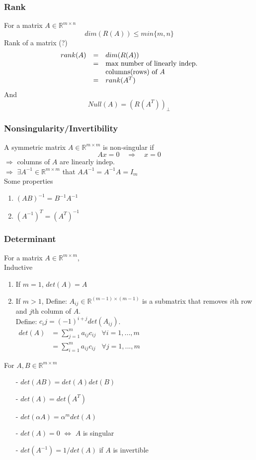 \begin{multicols}{2}
\subsubsection{Rank}
For a matrix $A\in\mathbb{R}^{m\times n}$
\[
    dim(R(A))\leq min\{m,n\}
\]
Rank of a matrix (?)
\[
    \begin{array}{cll}
        rank(A) & = &dim(R(A)) \\
        & = &\text{\rm max number of linearly indep.} \\
        & & \text{\rm columns(rows) of } A \\
        & = &rank(A^T)
    \end{array}
\]
And
\[
    Null(A)=(R(A^T))_\bot
\]

\subsubsection{Nonsingularity/Invertibility}
A symmetric matrix $A\in\mathbb{R}^{m\times m}$ is non-singular if
\[
    Ax=0\quad \Longrightarrow \quad x=0
\]
$\Longrightarrow$ columns of $A$ are linearly indep. \\
$\Longrightarrow$ $\exists A^{-1}\in\mathbb{R}^{m\times m}$ that $AA^{-1}=A^{-1}A=I_m$ \\
Some properties
\begin{enumerate}
    \item $(AB)^{-1}=B^{-1}A^{-1}$
    \item $(A^{-1})^T=(A^T)^{-1}$
\end{enumerate}

\subsubsection{Determinant}
For a matrix $A\in\mathbb{R}^{m\times m}$, \\
Inductive
\begin{enumerate}
    \item If $m=1$, $det(A)=A$
    \item If $m>1$,
    Define: $A_{ij}\in\mathbb{R}^{(m-1)\times(m-1)}$ is a submatrix that removes $i$th row and 
    $j$th column of $A$. \\
    Define: $c_ij=(-1)^{i+j}det(A_{ij})$. \\
    $\begin{array}{lll}
        det(A) &=\sum_{j=1}^m a_{ij}c_{ij}& \forall i=1,...,m \\
        & = \sum_{i=1}^m a_{ij}c_{ij} & \forall j = 1,...,m
    \end{array}$
\end{enumerate}
For $A,B\in\mathbb{R}^{m\times m}$
\begin{itemize}
    \item [-] $det(AB)=det(A)det(B)$
    \item [-] $det(A)=det(A^T)$
    \item [-] $det(\alpha A)=\alpha^m det(A)$
    \item [-] $det(A)=0$ $\Longleftrightarrow$ $A$ is singular
    \item [-] $det(A^{-1})=1/det(A)$ if $A$ is invertible
\end{itemize}


\end{multicols}
